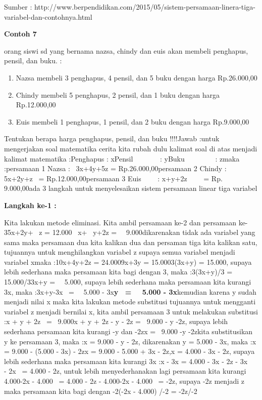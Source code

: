 \documentclass[11pt,fleqn]{book} %
\begin{document}
\begin{myEnumerate}
\begin{itemize}
\noindent Sumber : http://www.berpendidikan.com/2015/05/sistem-persamaan-linera-tiga-variabel-dan-contohnya.html

\noindent 

\noindent \textbf{Contoh 7 }

 orang siswi sd yang bernama nazsa, chindy dan euis akan membeli penghapus, pensil, dan buku. :

\begin{enumerate}
\item  Nazsa membeli 3 penghapus, 4 pensil, dan 5 buku dengan harga Rp.26.000,00

\item  Chindy membeli 5 penghapus, 2 pensil, dan 1 buku dengan harga Rp.12.000,00

\item  Euis membeli 1 penghapus, 1 pensil, dan 2 buku dengan harga Rp.9.000,00
\end{enumerate}

\noindent Tentukan berapa harga penghapus, pensil, dan buku !!!!Jawab :untuk mengerjakan soal matematika cerita kita rubah dulu kalimat soal di atas menjadi kalimat matematika :Penghapus : xPensil~~~~~~~ : yBuku~~~~~~~~ : zmaka :persamaan 1 Nazsa :~ 3x+4y+5z = Rp.26.000,00persamaan 2 Chindy : 5x+2y+z~ = Rp.12.000,00persamaan 3 Euis~~~~ : x+y+2z~~~~ = Rp.~ 9.000,00ada 3 langkah untuk menyelesaikan sistem persamaan linear tiga variabel

\noindent \textbf{Langkah ke-1 :}

\noindent Kita lakukan metode eliminasi. Kita ambil persamaan ke-2 dan persamaan ke-35x+2y+~ z = 12.000~ x+~ y+2z =~~ 9.000dikarenakan tidak ada variabel yang sama maka persamaan dua kita kalikan dua dan persaman tiga kita kalikan satu, tujuannya untuk menghilangkan variabel z supaya semua variabel menjadi variabel xmaka :10x+4y+2z = 24.0009x+3y = 15.0003(3x+y) = 15.000, supaya lebih sederhana maka persamaan kita bagi dengan 3, maka :3(3x+y)/3 = 15.000/33x+y =~~ 5.000, supaya lebih sederhana maka persamaan kita kurangi 3x, maka :3x+y-3x~ =~~ 5.000 - 3x\textbf{y~ =~~ 5.000 - 3x}kemudian karena y sudah menjadi nilai x maka kita lakukan metode substitusi tujuannya untuk mengganti variabel z menjadi bernilai x, kita ambil persamaan 3 untuk melakukan substitusi :x + y + 2z~ =~ 9.000x + y + 2z - y - 2z =~ 9.000 - y -2z, supaya lebih sederhana persamaan kita kurangi -y dan -2zx =~ 9.000 -y -2zkita substitusikan y ke persamaan 3, maka :x = 9.000 - y - 2z, dikarenakan y = 5.000 - 3x, maka :x = 9.000 - (5.000 - 3x) - 2zx = 9.000 - 5.000 + 3x - 2z,x = 4.000 - 3x - 2z, supaya lebih sederhana maka persamaan kita kurangi 3x :x - 3x = 4.000 - 3x - 2z - 3x~~ - 2x~ = 4.000 - 2z, untuk lebih menyederhanakan lagi persamaan kita kurangi~ 4.000-2x - 4.000~ = 4.000 - 2z - 4.000-2x - 4.000~ = -2z, supaya -2z menjadi z maka persamaan kita bagi dengan -2(-2x - 4.000) /-2 = -2z/-2


\end{itemize}
\end{myEnumerate}
\end{document}
